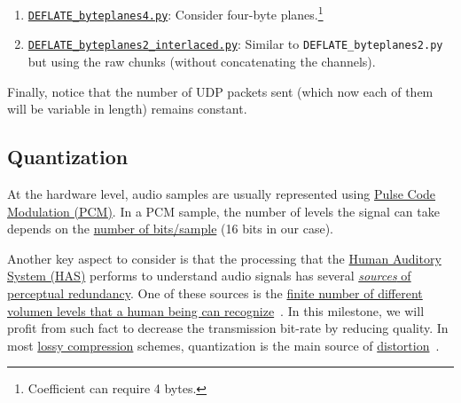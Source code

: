 \begin{enumerate}
  Similar to \verb|DEFLATE_byteplanes2.py| but considering three
  byte-planes. This would allow compression of
  \emph{coefficients}\footnote{Used in a future improvements of
  intercom.} that requires more than two bytes to be represented.
\item
  \href{https://github.com/Tecnologias-multimedia/InterCom/blob/master/src/DEFLATE\_byteplanes4.py}{\texttt{DEFLATE\_byteplanes4.py}}:
  Consider four-byte planes.\footnote{Coefficient can require 4 bytes.}
\item
  \href{https://github.com/Tecnologias-multimedia/InterCom/blob/master/src/DEFLATE_byteplanes2\_interlaced.py}{\texttt{DEFLATE\_byteplanes2\_interlaced.py}}:
  Similar to \verb|DEFLATE_byteplanes2.py| but using the raw chunks
  (without concatenating the channels).
\end{enumerate}

Finally, notice that the number of UDP packets sent (which now each of
them will be variable in length) remains constant.

\subsection{Quantization}
At the hardware level, audio samples are usually represented
using \href{https://en.wikipedia.org/wiki/Pulse-code_modulation}{Pulse
  Code Modulation (PCM)}. In a PCM sample, the number of levels
the signal can take depends on the
\href{https://en.wikipedia.org/wiki/Audio_bit_depth}{number of
  bits/sample} (16 bits in our case).

Another key aspect to consider is that the processing that the
\href{https://en.wikipedia.org/wiki/Auditory_system}{Human
  Auditory System (HAS)} performs to understand audio signals has several
\href{https://en.wikipedia.org/wiki/Psychoacoustics}{\emph{sources} of
  perceptual redundancy}. One of these sources is the
\href{https://en.wikipedia.org/wiki/Equal-loudness_contour}{finite
  number of different volumen levels that a human being can
  recognize}~\cite{bosi2003intro}. In this milestone, we will profit from
such fact to decrease the transmission bit-rate by reducing
quality. In most
\href{https://en.wikipedia.org/wiki/Lossy_compression}{lossy
  compression} schemes, quantization is the main source of
\href{https://en.wikipedia.org/wiki/Distortion}{distortion}~\cite{taubman2002jpeg2000}.

